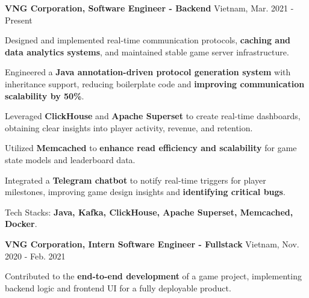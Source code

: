 \begin{cventries} %
  \cvsimpleentry
    {\textbf{VNG Corporation, Software Engineer - Backend}} %
    {Vietnam, Mar. 2021 - Present} %
    {
      \begin{cvitems} %
        \item {Designed and implemented real-time communication protocols, \textbf{caching and data analytics systems}, and maintained stable game server infrastructure.}
        \item {Engineered a \textbf{Java annotation-driven protocol generation system} with inheritance support, reducing boilerplate code and \textbf{improving communication scalability by 50\%}.}
        \item {Leveraged \textbf{ClickHouse} and \textbf{Apache Superset} to create real-time dashboards, obtaining clear insights into player activity, revenue, and retention.}
        \item {Utilized \textbf{Memcached} to \textbf{enhance read efficiency and scalability} for game state models and leaderboard data.}
        \item {Integrated a \textbf{Telegram chatbot} to notify real-time triggers for player milestones, improving game design insights and \textbf{identifying critical bugs}.}
        \item {Tech Stacks: \textbf{Java, Kafka, ClickHouse, Apache Superset, Memcached, Docker}.}
      \end{cvitems}
    }
  \cvsimpleentry
    {\textbf{VNG Corporation, Intern Software Engineer - Fullstack}} %
    {Vietnam, Nov. 2020 - Feb. 2021} %
    {
      \begin{cvitems} %
        \item {Contributed to the \textbf{end-to-end development} of a game project, implementing backend logic and frontend UI for a fully deployable product.}
      \end{cvitems}
    }


\end{cventries}
